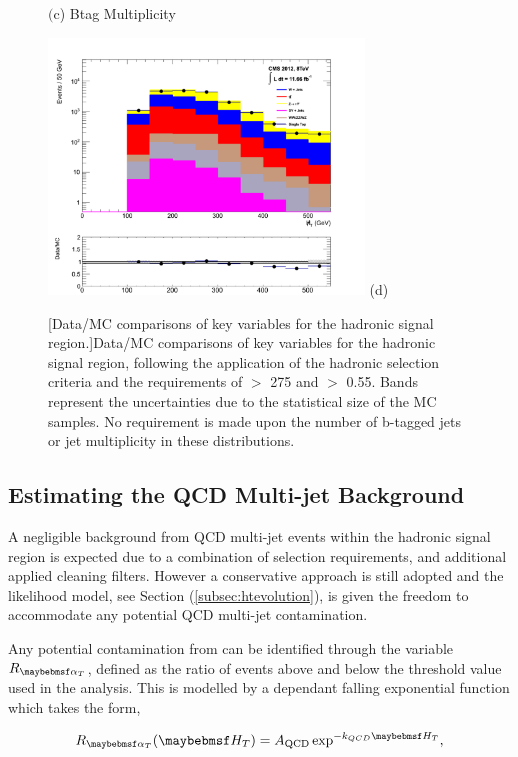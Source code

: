 \begin{figure}[ht]
\begin{minipage}{.48\textwidth}
$\text{(c}$) Btag Multiplicity
\end{minipage}
\begin{minipage}{.48\textwidth}
\centering
\includegraphics[width = 3.3in]{plots/had_mht_datamc.pdf}
(d) \mht
\end{minipage}
[Data/MC comparisons of key variables for the hadronic signal region.]{Data/MC comparisons of key variables for the hadronic signal region, following the application of the hadronic selection criteria and the requirements of \theht $>$ 275 \GeV and \alphat $>$ 0.55. Bands represent the uncertainties due to the statistical size of the MC samples. No requirement is made upon the number of b-tagged jets or jet multiplicity in these distributions.}\label{fig:hadmcplots}
\end{figure}


\subsection{Estimating the QCD Multi-jet Background}
\label{subsec:qcdbackground}

A negligible background from QCD multi-jet events within the hadronic signal region is expected due to a combination of selection requirements, and additional applied cleaning filters. However a conservative approach is still adopted and the likelihood model, see Section (\ref{subsec:htevolution}), is given the freedom to accommodate any potential QCD multi-jet contamination. 

Any potential contamination from can be identified through the variable $R_{\alphat}$, defined as the ratio of events above and below the \alphat threshold value used in the analysis. This is modelled by a \theht dependant falling exponential function which takes the form,

\begin{equation}
\label{eq:qcdmodel}
R_{\alphat}(\theht) =  A_{\text{QCD}} \exp^{-k_{QCD}\theht},
\end{equation}

